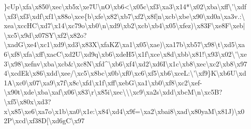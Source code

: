 \documentclass[11pt]{article}
\begin{document}
\}cUp\textbackslash{}xfa\textbackslash{}x850\textbackslash{}xec\textbackslash{}xb5x\textbackslash{}xe7U\textbackslash{}nO\textbackslash{}xb6<\textbackslash{}x05c\textbackslash{}xf3\textbackslash{}xa3\textbackslash{}x14*\textbackslash{}x02\textbackslash{}xba\textbackslash{}xff\textbackslash{}'\textbackslash{}xdf\textbackslash{}xf3\textbackslash{}xf3\textbackslash{}xdf\textbackslash{}xf1\textbackslash{}x88o\textbackslash{}xce\{b\textbackslash{}xfe\textbackslash{}x82\textbackslash{}xb7\textbackslash{}xf2\textbackslash{}x8f|n\textbackslash{}xcb\textbackslash{}xbe\textbackslash{}x90\textbackslash{}xd0a\textbackslash{}xa3v.:\textbackslash{}xea\textbackslash{}xccHC\textbackslash{}xd7\textbackslash{}x14\textbackslash{}xc79o\textbackslash{}xb0\textbackslash{}n\textbackslash{}xd9\textbackslash{}xb2\textbackslash{}xcb\textbackslash{}xb4\textbackslash{}x05\textbackslash{}xfez)\textbackslash{}x83F\textbackslash{}xe8F\textbackslash{}xeb|\textbackslash{}xc5\textbackslash{}x9d\textbackslash{}x07SY\textbackslash{}xf2\textbackslash{}x82o?\textbackslash{}xadG\textbackslash{}xe4\textbackslash{}xc1\textbackslash{}xd9\textbackslash{}xd3\textbackslash{}x83X\textbackslash{}xfaKZ\textbackslash{}xa1\textbackslash{}x05\textbackslash{}xae)\textbackslash{}xa17b\textbackslash{}xb57\textbackslash{}x98\textbackslash{}t\textbackslash{}xd5\textbackslash{}xa6\textbackslash{}xf8\textbackslash{}xfa\textbackslash{}xff\textbackslash{}xacC\textbackslash{}xd2U\textbackslash{}xd9q\textbackslash{}xb6\textbackslash{}xdeH5\textbackslash{}x1f\textbackslash{}xce\textbackslash{}x8d\textbackslash{}xbb\textbackslash{}x81!\textbackslash{}x93\textbackslash{}x02\textbackslash{}'\textbackslash{}xe3\textbackslash{}x98\textbackslash{}xefnv\textbackslash{}xba\textbackslash{}xcb\&\textbackslash{}xc8N\textbackslash{}xfd\^{}\textbackslash{}xb6\textbackslash{}xf4\textbackslash{}xd2\textbackslash{}xd6I\textbackslash{}x1c\textbackslash{}xb8\textbackslash{}xec\textbackslash{}xc2\textbackslash{}xb8\textbackslash{}x974\textbackslash{}xcdEk\textbackslash{}x86\textbackslash{}xdd\textbackslash{}xee/\textbackslash{}xc5\textbackslash{}x8bc\textbackslash{}x0b\textbackslash{}xf0\textbackslash{}xc6\textbackslash{}xf5\textbackslash{}xb6\textbackslash{}xceL:\textbackslash{}'\textbackslash{}xf9\}K\textbackslash{}xb6U\textbackslash{}xd1A\textbackslash{}xc0\textbackslash{}x07\textbackslash{}xa9\textbackslash{}x7f\textbackslash{}x8c\textbackslash{}xfd\textbackslash{}x1f\textbackslash{}xff\textbackslash{}xebG\textbackslash{}xa1\textbackslash{}xb0\textbackslash{}xf8\textbackslash{}xc2\textbackslash{}xef-\textbackslash{}x90t\textbackslash{}xde\textbackslash{}xba\textbackslash{}xaf\textbackslash{}x06\textbackslash{}x83\textbackslash{}r\textbackslash{}x85i\textbackslash{}xec\textbackslash{}\textbackslash{}\textbackslash{}xc9\textbackslash{}xa2s\textbackslash{}xdd\textbackslash{}xbcM\textbackslash{}n\textbackslash{}xc5B?\textbackslash{}xf5\textbackslash{}x80x\textbackslash{}xd3?x\textbackslash{}x85\textbackslash{}xe6\textbackslash{}xa7o\textbackslash{}x1b\textbackslash{}xa0\textbackslash{}x1e:\textbackslash{}x84\textbackslash{}xd4\textbackslash{}x9f=\textbackslash{}xa2\textbackslash{}xbai8\textbackslash{}xad\textbackslash{}x80yaM\textbackslash{}x81J)\textbackslash{}x02P\textbackslash{}xcd\textbackslash{}xf38D[\textbackslash{}xd6gC\textbackslash{}x97\textbacksl
\end{document}
